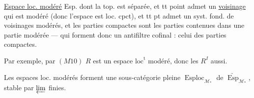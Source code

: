 \uline{Espace loc. modéré} Esp.   dont la top. est  séparée, et tt point admet un \uline{voisinage} qui est  modéré (donc l'espace est loc. cpct), et tt pt admet un syst. fond. de voisinages modérés, et les parties compactes sont les parties contenues dans une partie modérée --- qui forment donc un antifiltre cofinal : celui des parties compactes.

Par exemple, par $(M10)$ $R$ est un espace $\mathrm{loc}^{\mathrm t}$ modéré, donc les $R^I$ aussi.

Les espaces loc. modérés  forment une sous-catégorie pleine $\operatorname{Esploc}_{\mathcal M_*}$ de $\underrightarrow{\operatorname{Esp}}_{\mathcal M_*}$, stable par $\varprojlim$ finies.

